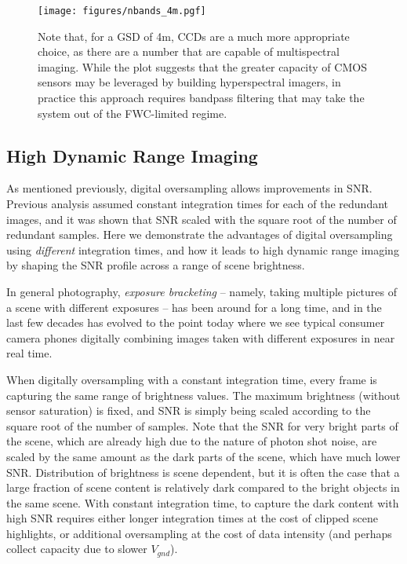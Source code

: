 \documentclass[]{spieman}  %
\begin{document}
\begin{figure}
  \centering
  \texttt{[image: figures/nbands\_4m.pgf]}
  \caption{Note that, for a GSD of 4m, CCDs are a much more appropriate choice, as there are a number that are capable of multispectral imaging. While the plot suggests that the greater capacity of CMOS sensors may be leveraged by building hyperspectral imagers, in practice this approach requires bandpass filtering that may take the system out of the FWC-limited regime.
  \label{fig:nbands_4m}}
\end{figure}


\subsection{High Dynamic Range Imaging}
\label{sec:hdr}

As mentioned previously, digital oversampling allows improvements in SNR. Previous analysis assumed constant integration times for each of the redundant images, and it was shown that SNR scaled with the square root of the number of redundant samples. Here we demonstrate the advantages of digital oversampling using \emph{different} integration times, and how it leads to high dynamic range imaging by shaping the SNR profile across a range of scene brightness.

In general photography, \emph{exposure bracketing} -- namely, taking multiple pictures of a scene with different exposures -- has been around for a long time, and in the last few decades has evolved to the point today where we see typical consumer camera phones digitally combining images taken with different exposures in near real time.

When digitally oversampling with a constant integration time, every frame is capturing the same range of brightness values.  The maximum brightness (without sensor saturation) is fixed, and SNR is simply being scaled according to the square root of the number of samples.  Note that the SNR for very bright parts of the scene, which are already high due to the nature of photon shot noise, are scaled by the same amount as the dark parts of the scene, which have much lower SNR. Distribution of brightness is scene dependent, but it is often the case that a large fraction of scene content is relatively dark compared to the bright objects in the same scene.  With constant integration time, to capture the dark content with high SNR requires either longer integration times at the cost of clipped scene highlights, or additional oversampling at the cost of data intensity (and perhaps collect capacity due to slower $V_{gnd}$).
\end{document}
